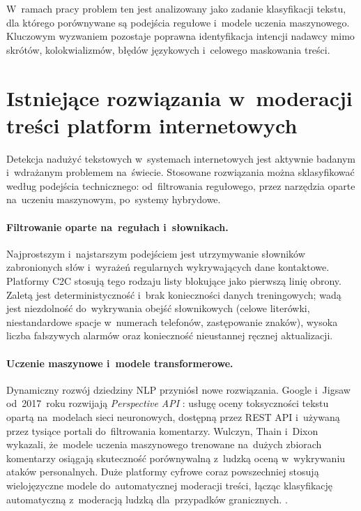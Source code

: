 W~ramach pracy problem ten jest analizowany jako zadanie klasyfikacji tekstu, dla
którego porównywane są podejścia regułowe i~modele uczenia maszynowego. Kluczowym
wyzwaniem pozostaje poprawna identyfikacja intencji nadawcy mimo skrótów,
kolokwializmów, błędów językowych i~celowego maskowania treści.

\section{Istniejące rozwiązania w~moderacji treści platform internetowych}
\label{sec:sota}

Detekcja nadużyć tekstowych w~systemach internetowych jest aktywnie badanym i~wdrażanym
problemem na~świecie. Stosowane rozwiązania można sklasyfikować według podejścia
technicznego: od~filtrowania regułowego, przez narzędzia oparte na~uczeniu maszynowym,
po~systemy hybrydowe.

\paragraph{Filtrowanie oparte na~regułach i~słownikach.}
Najprostszym i~najstarszym podejściem jest utrzymywanie słowników zabronionych słów
i~wyrażeń regularnych wykrywających dane kontaktowe. Platformy C2C stosują tego
rodzaju listy blokujące jako pierwszą linię obrony. Zaletą jest deterministyczność
i~brak konieczności danych treningowych; wadą jest niezdolność do~wykrywania
obejść słownikowych (celowe literówki, niestandardowe spacje w~numerach telefonów,
zastępowanie znaków), wysoka liczba fałszywych alarmów oraz konieczność
nieustannej ręcznej aktualizacji.

\paragraph{Uczenie maszynowe i~modele transformerowe.}
Dynamiczny rozwój dziedziny NLP przyniósł nowe rozwiązania.
Google i~Jigsaw od~2017~roku rozwijają \textit{Perspective API}
\cite{bib:perspective}: usługę oceny toksyczności tekstu opartą na~modelach
sieci neuronowych, dostępną przez REST API i~używaną przez tysiące portali
do~filtrowania komentarzy. Wulczyn, Thain i~Dixon \cite{bib:wulczyn2017} wykazali,
że~modele uczenia maszynowego trenowane na~dużych zbiorach komentarzy osiągają
skuteczność porównywalną z~ludzką oceną w~wykrywaniu ataków personalnych.
Duże platformy cyfrowe coraz powszechniej stosują wielojęzyczne modele
do~automatycznej moderacji treści, łącząc klasyfikację automatyczną
z~moderacją ludzką dla~przypadków granicznych.
\cite{bib:perspective,bib:wulczyn2017}.

